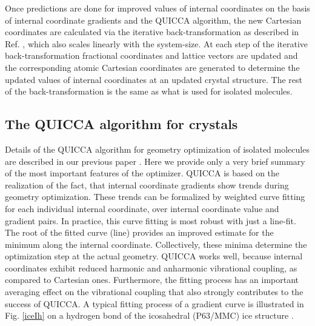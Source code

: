 \documentclass[prl,aps,preprint,superbib,12pt]{revtex4}
\begin{document}
Once predictions are done for improved values of internal coordinates
on the basis of internal coordinate gradients and the QUICCA 
\cite{KNemeth04} algorithm, the new Cartesian coordinates 
are calculated via the iterative back-transformation
as described in Ref. , which also scales 
linearly with the system-size. At each step of the iterative 
back-transformation fractional coordinates and lattice vectors
are updated and the corresponding atomic Cartesian coordinates are
generated to determine the updated values of internal coordinates
at an updated crystal structure. The rest of the back-transformation
is the same as what is used for isolated molecules.

\subsection{The QUICCA algorithm for crystals}
Details of the QUICCA algorithm for geometry optimization 
of isolated molecules are 
described in our previous paper \cite{KNemeth04}. Here we provide 
only a very brief summary of the most important features of the 
optimizer.
QUICCA is based on the realization of the fact, that internal coordinate
gradients show trends during geometry optimization.
These trends can be formalized by weighted curve fitting for each 
individual internal coordinate, over internal coordinate value and 
gradient pairs.
In practice, this curve fitting is most robust with just a line-fit. 
The root of the
fitted curve (line) provides an improved estimate for the minimum
along the internal coordinate. Collectively, these minima determine
the optimization step at the actual geometry.
QUICCA works well, because internal coordinates exhibit  
reduced harmonic and anharmonic vibrational coupling, as
compared to Cartesian ones. Furthermore, the fitting process
has an important averaging effect on the vibrational coupling
that also strongly contributes to the success of QUICCA.
A typical fitting process of a gradient curve is illustrated in 
Fig. \ref{iceIh} on a hydrogen bond of the icosahedral (P63/MMC)
ice structure \cite{AGoto90}.
\end{document}
